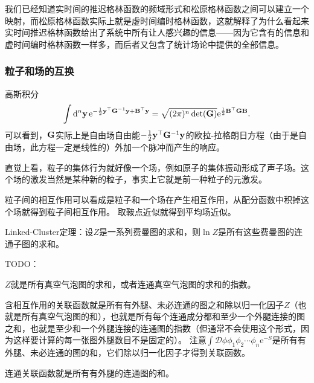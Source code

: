 \documentclass[hyperref, UTF8, a4paper]{ctexart}
\newcommand*{\ee}{\mathrm{e}}
\newcommand*{\fd}[1]{\mathcal{D}{#1}}
\begin{document}
我们已经知道实时间的推迟格林函数的频域形式和松原格林函数之间可以建立一个映射，而松原格林函数实际上就是虚时间编时格林函数，这就解释了为什么看起来实时间推迟格林函数给出了系统中所有让人感兴趣的信息——因为它含有的信息和虚时间编时格林函数一样多，而后者又包含了统计场论中提供的全部信息。

\subsubsection{粒子和场的互换}

高斯积分
\begin{equation}
    \int \dd[n]{\vb{y}} \ee^{-\frac{1}{2} \vb{y}^\top \vb{G}^{-1} \vb{y} + \vb{B}^\top \vb{y}} = \sqrt{(2\pi)^n \det(\vb{G})} \ee^{\frac{1}{2} \vb{B}^\top \vb{G} \vb{B}}.
\end{equation}
可以看到，$\vb{G}$实际上是自由场自由能$-\frac{1}{2} \vb{y}^\top \vb{G}^{-1} \vb{y}$的欧拉-拉格朗日方程（由于是自由场，此方程一定是线性的）外加一个脉冲而产生的响应。

直觉上看，粒子的集体行为就好像一个场，例如原子的集体振动形成了声子场。这个场的激发当然是某种新的粒子，事实上它就是前一种粒子的元激发。

粒子间的相互作用可以看成是粒子和一个场在产生相互作用，从配分函数中积掉这个场就得到粒子间相互作用。
取鞍点近似就得到平均场近似。

Linked-Cluster定理：设$Z$是一系列费曼图的求和，则$\ln Z$是所有这些费曼图的连通子图的求和。

TODO：

$Z$就是所有真空气泡图的求和，或者连通真空气泡图的求和的指数。

含相互作用的关联函数就是所有有外腿、未必连通的图之和除以归一化因子$Z$（也就是所有真空气泡图的和），也就是所有每个连通成分都和至少一个外腿连接的图之和，也就是至少和一个外腿连接的连通图的指数（但通常不会使用这个形式，因为这样要计算的每一张图外腿数目不是固定的）。
注意$\int \fd{\phi} \phi_1 \phi_2 \cdots \phi_n \ee^{-S}$是所有有外腿、未必连通的图的和，它们除以归一化因子才得到关联函数。

连通关联函数就是所有有外腿的连通图的和。
\end{document}
